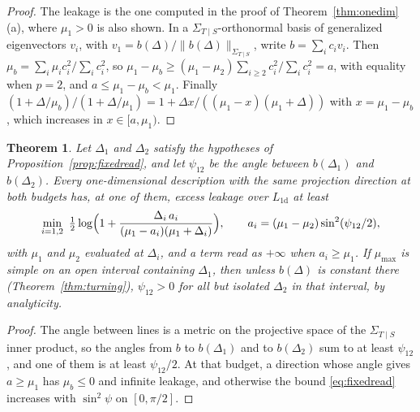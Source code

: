 \documentclass[11pt,onecolumn]{IEEEtran}
\newtheorem{theorem}{Theorem}
\newcommand{\Kc}{\Sigma_{T\mid S}}
\begin{document}
\begin{proof}
The leakage is the one computed in the proof of
Theorem~\ref{thm:onedim}(a), where $\mu_1>0$ is also shown. In a
$\Kc$-orthonormal basis of generalized eigenvectors $v_i$, with
$v_1=b(\Delta)/\|b(\Delta)\|_{\Kc}$, write $b=\sum_ic_iv_i$. Then
$\mu_b=\sum_i\mu_ic_i^2/\sum_ic_i^2$, so
$\mu_1-\mu_b\ge(\mu_1-\mu_2)\sum_{i\ge2}c_i^2/\sum_ic_i^2=a$, with equality
when $p=2$, and $a\le\mu_1-\mu_b<\mu_1$. Finally
$(1+\Delta/\mu_b)/(1+\Delta/\mu_1)=1+\Delta x/((\mu_1-x)(\mu_1+\Delta))$ with
$x=\mu_1-\mu_b$, which increases in $x\in[a,\mu_1)$.
\end{proof}

\begin{theorem}\label{thm:forced}
Let $\Delta_1$ and $\Delta_2$ satisfy the hypotheses of
Proposition~\ref{prop:fixedread}, and let $\psi_{12}$ be the angle
between $b(\Delta_1)$ and $b(\Delta_2)$. Every one-dimensional
description with the same projection direction at both budgets has, at
one of them, excess leakage over $L_{\mathrm{1d}}$ at least
\[
\min_{i=1,2}\ \tfrac12\log\Bigl(1+\frac{\Delta_i\,a_i}{(\mu_1-a_i)(\mu_1+\Delta_i)}\Bigr),
\qquad a_i=(\mu_1-\mu_2)\sin^2(\psi_{12}/2),
\]
with $\mu_1$ and $\mu_2$ evaluated at $\Delta_i$, and a term read as
$+\infty$ when $a_i\ge\mu_1$. If $\mu_{\max}$ is simple on an open
interval containing $\Delta_1$, then unless $b(\Delta)$ is constant there
(Theorem~\ref{thm:turning}), $\psi_{12}>0$ for all but isolated $\Delta_2$
in that interval, by analyticity.
\end{theorem}

\begin{proof}
The angle between lines is a metric on the projective space of the
$\Kc$ inner product, so the angles from $b$ to $b(\Delta_1)$ and to
$b(\Delta_2)$ sum to at least $\psi_{12}$, and one of them is at least
$\psi_{12}/2$. At that budget, a direction whose angle gives $a\ge\mu_1$
has $\mu_b\le0$ and infinite leakage, and otherwise the bound
\eqref{eq:fixedread} increases with $\sin^2\psi$ on $[0,\pi/2]$.
\end{proof}
\end{document}
